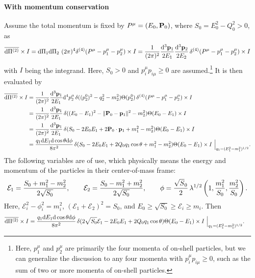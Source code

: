 \documentclass[CheatSheet]{subfiles}
\begin{document}
\paragraph{With momentum conservation}
Assume the total momentum is fixed by $P^\mu=(E_0, {\mathbf{P}}_0)$, where $S_0=E_0^2-Q_0^2>0$, as
\begin{equation}
 \overline{\dd\Pi^{(2)}}\times I
   = \dd\Pi_1\dd\Pi_2\,\tpdd[4](P^\mu-p_1^\mu-p_2^\mu)\times I
   =\frac{1}{(2\pi)^2}\frac{\dd^3{\vc p_1}}{2E_1}\frac{\dd^3{\vc p_2}}{2E_2}\diracdelta[4](P^\mu-p_1^\mu-p_2^\mu)\times I
\end{equation}
with $I$ being the integrand. Here, $S_0>0$ and $p^\mu_i p_{i\mu}\ge 0$ are assumed.\footnote{%
Here, $p_1^\mu$ and $p_2^\mu$ are primarily the four momenta of on-shell particles, but we can generalize the discussion to any four momenta with $p_i^\mu p_{i\mu}\ge 0$, such as the sum of two or more momenta of on-shell particles.}
It is then evaluated by
\begin{align}
 \overline{\dd\Pi^{(2)}}\times I
  &= \frac{1}{(2\pi)^2}\frac{\dd^3{\vc p_1}}{2E_1}{\dd^4 p_2^\mu}
  \diracdelta((p_2^0)^2-q_2^2-m_2^2)\Theta(p_2^0)
  \diracdelta[4](P^\mu-p_1^\mu-p_2^\mu)\times I
  \\&=
   \frac{1}{(2\pi)^2}\frac{\dd^3{\vc p_1}}{2E_1}
  \diracdelta((E_0-E_1)^2-\|\vc P_0-\vc p_1\|^2-m_2^2)\Theta(E_0-E_1)\times I
  \\&=
   \frac{1}{(2\pi)^2}\frac{\dd^3{\vc p_1}}{2E_1}
  \diracdelta(S_0-2E_0E_1+2\vc P_0\cdot\vc p_1+m_1^2-m_2^2)\Theta(E_0-E_1)\times I
  \\&=
   \frac{q_1\dd E_1\dd\cos\theta\dd\phi}{8\pi^2}
  \diracdelta(S_0-2E_0E_1+2Q_0q_1\cos\theta+m_1^2-m_2^2)\Theta(E_0-E_1)\times I~\Big|_{q_1=(E_1^2-m_1^2)^{1/2}}.
\end{align}
The following variables are of use, which physically means the energy and momentum of the particles in their center-of-mass frame:
\begin{equation}
  \mathcal E_1=\frac{S_0+m_1^2-m_2^2}{2\sqrt{S_0}},\qquad
  \mathcal E_2=\frac{S_0-m_1^2+m_2^2}{2\sqrt{S_0}},\qquad
  \phi=\frac{\sqrt S_0}{2}\Kallen[1/2]\left(1,\frac{m_1^2}{S_0},\frac{m_2^2}{S_0}\right).
\end{equation}
Here,  $\mathcal E_i^2-\phi_i^2=m_i^2$, $(\mathcal E_1+\mathcal E_2)^2=S_0$, and $E_0\ge \sqrt{S_0}\ge \mathcal E_i\ge m_i$. Then
\begin{align}
 \overline{\dd\Pi^{(2)}}\times I
  &=
   \frac{q_1\dd E_1\dd\cos\theta\dd\phi}{8\pi^2}
  \diracdelta(2\sqrt{S_0}\mathcal E_1-2E_0E_1+2Q_0q_1\cos\theta)\Theta(E_0-E_1)\times I~\Big|_{q_1=(E_1^2-m_1^2)^{1/2}}.
\end{align}
\end{document}
